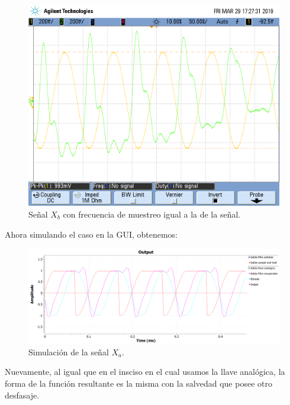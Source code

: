 \documentclass[../../ASSD_TP1_G7.tex]{subfiles}
\begin{document}
\begin{figure}[H]

\begin{centering}
\includegraphics[scale=0.5]{Imagenes/yh_pt6c_sin2}\caption{Señal $X_{b}$ con frecuencia de muestreo igual a la de la señal.}
\par\end{centering}
\end{figure}

Ahora simulando el caso en la GUI, obtenemos:

\begin{figure}[H]
\begin{centering}
\includegraphics[scale=0.5]{Imagenes/simulacion_syh_seno_c}\caption{Simulación de la señal $X_{a}$.}
\par\end{centering}
\end{figure}

Nuevamente, al igual que en el insciso en el cual usamos la llave
analógica, la forma de la función resultante es la misma con la salvedad
que posee otro desfasaje.
\end{document}
